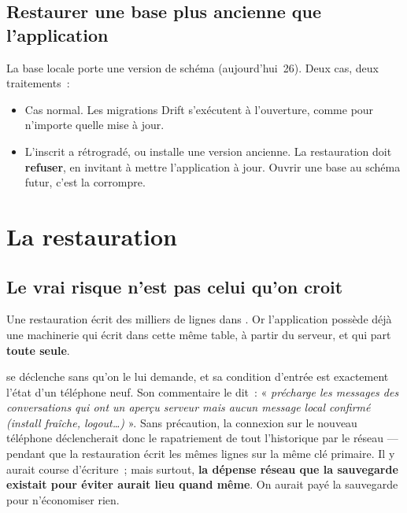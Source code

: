 \documentclass[11pt,a4paper,oneside]{report}
\begin{document}
\section{Restaurer une base plus ancienne que l'application}

La base locale porte une version de schéma (aujourd'hui~26). Deux cas, deux traitements~:

\begin{itemize}[leftmargin=*]
  \item {} Cas normal. Les migrations Drift
        s'exécutent à l'ouverture, comme pour n'importe quelle mise à jour.
  \item {} L'inscrit a rétrogradé, ou installe
        une version ancienne. La restauration doit \textbf{refuser}, en invitant à mettre
        l'application à jour. Ouvrir une base au schéma futur, c'est la corrompre.
\end{itemize}

\chapter{La restauration}
\label{ch:restauration-tech}

\section{Le vrai risque n'est pas celui qu'on croit}

Une restauration écrit des milliers de lignes dans . Or l'application
possède déjà une machinerie qui écrit dans cette même table, à partir du serveur, et qui
part \textbf{toute seule}.

\begin{alerte}
 se déclenche sans qu'on le lui demande, et sa
condition d'entrée est exactement l'état d'un téléphone neuf. Son commentaire le dit~:
« \emph{précharge les messages des conversations qui ont un aperçu serveur mais aucun message
local confirmé (install fraîche, logout\ldots)} ». Sans précaution, la connexion sur le
nouveau téléphone déclencherait donc le rapatriement de tout l'historique par le réseau ---
pendant que la restauration écrit les mêmes lignes sur la même clé primaire. Il y aurait
course d'écriture~; mais surtout, \textbf{la dépense réseau que la sauvegarde existait pour
éviter aurait lieu quand même}. On aurait payé la sauvegarde pour n'économiser rien.
\end{alerte}
\end{document}
